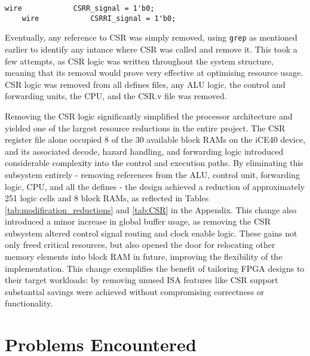 \documentclass[a4paper,10pt]{article}
\begin{document}
\begin{lstlisting}[style=verilog-style, caption=
    {Short example of eliminating CSR logic}, label={prog:CSR}]
	wire			CSRR_signal = 1'b0;
	wire			CSRRI_signal = 1'b0;
\end{lstlisting}

Eventually, any reference to CSR was simply removed,
using \texttt{grep} as mentioned earlier to identify
any intance where CSR was called and remove it.
This took a few attempts, as CSR logic was written throughout the system structure,
meaning that its removal would prove very effective at optimising resource usage.
CSR logic was removed from all defines files, any ALU logic,
the control and forwarding units, the CPU, 
and the CSR.v file was removed.

Removing the CSR logic significantly simplified the processor architecture and 
yielded one of the largest resource reductions in the entire project. 
The CSR register file alone occupied 8 of the 30 
available block RAMs on the iCE40 device, 
and its associated decode, hazard handling, 
and forwarding logic introduced considerable 
complexity into the control and execution paths. 
By eliminating this subsystem entirely -
removing references from the ALU, control unit, 
forwarding logic, CPU, and all the defines - 
the design achieved a reduction of approximately 251 logic cells and 8 block RAMs, 
as reflected in Tables \ref{tab:modification_reductions} and 
\ref{tab:CSR} in the Appendix. 
This change also introduced a minor increase in global buffer usage, 
as removing the CSR subsystem altered control signal routing and clock enable logic.
These gains not only freed critical resources, 
but also opened the door for relocating other memory elements into block RAM in future, 
improving the flexibility of the implementation. 
This change exemplifies the benefit of tailoring 
FPGA designs to their target workloads: 
by removing unused ISA features like CSR support
substantial savings were achieved without compromising correctness or functionality.

\section{Problems Encountered}
\label{sec:Problems_Encountered}
\end{document}
